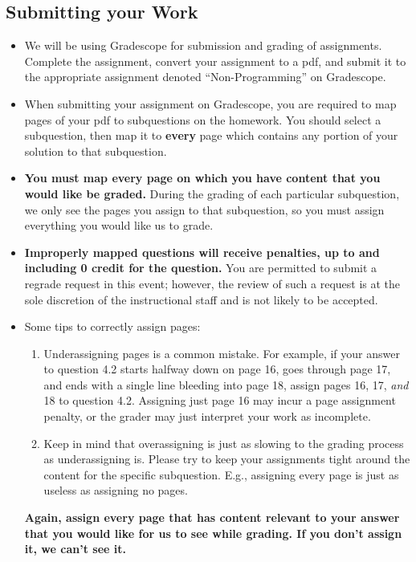 \subsection*{Submitting your Work}
\begin{itemize}
    \item We will be using Gradescope for submission and grading of assignments. Complete the assignment, convert your assignment to a pdf, and submit it to the appropriate assignment denoted ``Non-Programming'' on Gradescope.
    \item When submitting your assignment on Gradescope, you are required to map pages of your pdf to subquestions on the homework. You should select a subquestion, then map it to \textbf{every} page which contains any portion of your solution to that subquestion.
    \item \textbf{You must map every page on which you have content that you would like be graded.} During the grading of each particular subquestion, we only see the pages you assign to that subquestion, so you must assign everything you would like us to grade.
    \item \textbf{Improperly mapped questions will receive penalties, up to and including 0 credit for the question.} You are permitted to submit a regrade request in this event; however, the review of such a request is at the sole discretion of the instructional staff and is not likely to be accepted.
    \item Some tips to correctly assign pages:
    \begin{enumerate}[label = \arabic*.]
        \item Underassigning pages is a common mistake. For example, if your answer to question 4.2 starts halfway down on page 16, goes through page 17, and ends with a single line bleeding into page 18, assign pages 16, 17, \textit{and} 18 to question 4.2. Assigning just page 16 may incur a page assignment penalty, or the grader may just interpret your work as incomplete.
        \item Keep in mind that overassigning is just as slowing to the grading process as underassigning is. Please try to keep your assignments tight around the content for the specific subquestion. E.g., assigning every page is just as useless as assigning no pages.
    \end{enumerate}
    \textbf{Again, assign every page that has content relevant to your answer that you would like for us to see while grading. If you don't assign it, we can't see it.}
\end{itemize}
